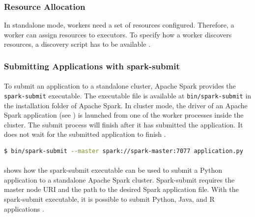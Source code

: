 \subsubsection{Resource Allocation}
\label{subsubsec:04_spark_standalone_res-alloc}
In standalone mode, workers need a set of resources configured. Therefore, a worker can assign resources to executors.
To specify how a worker discovers resources, a discovery script has to be available \cite{Apache2020Spark}.


\subsubsection{Submitting Applications with spark-submit}
\label{subsubsec:04_spark_standalone_submit}
\paragraph{}
To submit an application to a standalone cluster, Apache Spark provides the \texttt{spark-submit} executable. The executable file is available at \texttt{bin/spark-submit} in the installation folder of Apache Spark.
In cluster mode, the driver of an Apache Spark application (see ) is launched from one of the worker processes inside the cluster.
The submit process will finish after it has submitted the application. It does not wait for the submitted application to finish \cite{Apache2020Spark}.


\begin{lstlisting}[label=lst:04_spark_standalone_submit_example, caption=Example usage of the spark-submit executable, language=bash, numbers=none]
$ bin/spark-submit --master spark://spark-master:7077 application.py
\end{lstlisting}


\paragraph{}
 shows how the spark-submit executable can be used to submit a Python application to a standalone Apache Spark cluster.
Spark-submit requires the master node URI and the path to the desired Spark application file.
With the spark-submit executable, it is possible to submit Python, Java, and R applications \cite{Apache2020Spark}.


